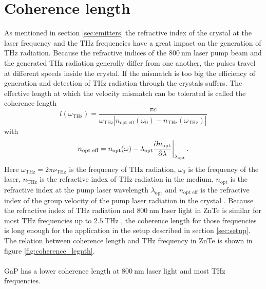 \section{Coherence length}
\label{sec:coherence_length}
As mentioned in section \ref{sec:emitters} the refractive index of the crystal at the laser frequency and the $\si{\tera\hertz}$ frequencies have a great impact on the generation of $\si{\tera\hertz}$ radiation.
Because the refractive indices of the $\SI{800}{\nano\meter}$ laser pump beam and the generated $\si{\tera\hertz}$ radiation generally differ from one another, the pulses travel at different speeds inside the crystal.
If the mismatch is too big the efficiency of generation and detection of $\si{\tera\hertz}$ radiation through the crystals suffers.
The effective length at which the velocity mismatch can be tolerated is called the coherence length
\begin{equation}
    l(\omega_{\si{\tera\hertz}}) = \frac{\pi c}{\omega_{\si{\tera\hertz}} \left | n_\text{opt eff}(\omega_0) - n_{\si{\tera\hertz}}(\omega_{\si{\tera\hertz}})\right |}
\end{equation}
with 
\begin{equation}
    n_{\text{opt eff}} = n_\text{opt}(\omega) - \lambda_\text{opt}\frac{\partial n_\text{opt}}{\partial \lambda}\biggl{|}_{\lambda_\text{opt}} \, .  
\end{equation}
Here $\omega_{\si{\tera\hertz}} = 2\pi  \nu_{\si{\tera\hertz}}$ is the frequency of $\si{\tera\hertz}$ radiation, $\omega_0$ is the frequency of the laser, $n_{\si{\tera\hertz}}$ is the refractive index of $\si{\tera\hertz}$ radiation in the medium, $n_\text{opt}$ is the refractive index at the pump laser wavelength $\lambda_\text{opt}$ and $n_\text{opt eff}$ is the refractive index of the group velocity of the pump laser radiation in the crystal \cite{coherence_legnth}.
Because the refractive index of $\si{\tera\hertz}$ radiation and $\SI{800}{\nano\meter}$ laser light in ZnTe is similar for most $\si{\tera\hertz}$ frequencies up to $\SI{2.5}{\tera\hertz}$ \cite{coherence_legnth}, the coherence length for those frequencies is long enough for the application in the setup described in section \ref{sec:setup}.
The relation between coherence length and $\si{\tera\hertz}$ frequency in ZnTe is shown in figure \ref{fig:coherence_legnth}.
\\\\
GaP has a lower coherence length at $\SI{800}{\nano\meter}$ laser light and most $\si{\tera\hertz}$ frequencies.
